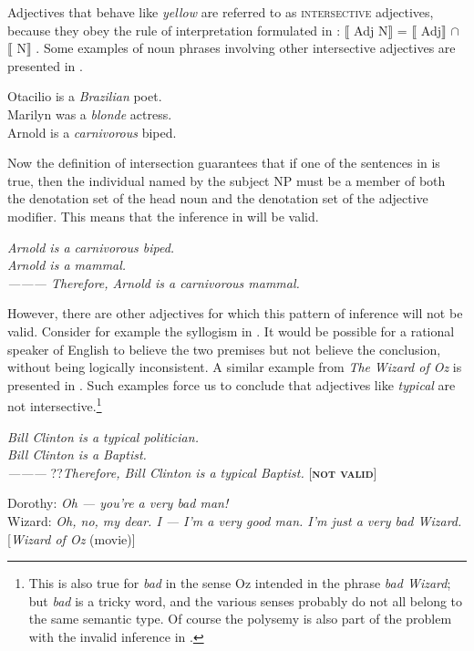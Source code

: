 Adjectives that behave like \textit{yellow} are referred to as \textsc{intersective} adjectives, because they obey the rule of interpretation formulated in : $\llbracket$ Adj N$\rrbracket$  = $\llbracket$ Adj$\rrbracket$  ${\cap}$ $\llbracket$ N$\rrbracket$ . Some examples of noun phrases involving other intersective adjectives are presented in .


\ea
\ea Otacilio is a \textit{Brazilian} poet.\\
\ex Marilyn was a \textit{blonde} actress.\\
\ex Arnold is a \textit{carnivorous} biped.
                       \z
\z


Now the definition of intersection guarantees that if one of the sentences in  is true, then the individual named by the subject NP must be a member of both the denotation set of the head noun and the denotation set of the adjective modifier. This means that the inference in  will be valid.


\ea
\textit{Arnold is a carnivorous biped.}\\
\textit{Arnold is a mammal.\\
———\FelixHRule
Therefore, Arnold is a carnivorous mammal.}
\z


However, there are other adjectives for which this pattern of inference will not be valid. Consider for example the syllogism in . It would be possible for a rational speaker of English to believe the two premises but not believe the conclusion, without being logically inconsistent. A similar example from \textit{The} \textit{Wizard of Oz} is presented in . Such examples force us to conclude that adjectives like \textit{typical} are not intersective.\footnote{This is also true for \textit{bad} in the sense Oz intended in the phrase \textit{bad Wizard}; but \textit{bad} is a tricky word, and the various senses probably do not all belong to the same semantic type. Of course the polysemy is also part of the problem with the invalid inference in .}


\ea
\textit{Bill Clinton is a typical politician.}\\
\textit{Bill Clinton is a Baptist.\\
———\FelixHRule
}??\textit{Therefore, Bill Clinton is a typical Baptist.}   [\textbf{\textsc{not valid}}]
\z

\ea
\ea  Dorothy: \textit{Oh — you’re a very bad man!}\\
Wizard: \textit{Oh, no, my dear. I — I’m a very good man. I’m just a very bad Wizard.}\\
{}[\textit{Wizard of Oz} (movie)]
                       \z
\z

